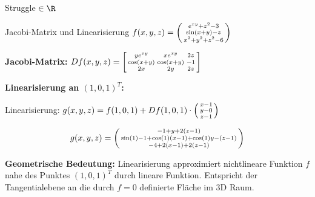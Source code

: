 \begin{remark}
    Struggle $\in \R$
\end{remark}

\begin{example2}{Jacobi-Matrix und Linearisierung} \small
$f(x, y, z) = \begin{psmallmatrix} e^{xy} + z^2 - 3 \\ \sin(x + y) - z \\ x^2 + y^2 + z^2 - 6 \end{psmallmatrix}$

\textbf{Jacobi-Matrix:}
$Df(x, y, z) = \begin{bsmallmatrix} ye^{xy} & xe^{xy} & 2z \\ \cos(x + y) & \cos(x + y) & -1 \\ 2x & 2y & 2z \end{bsmallmatrix}$

\textbf{Linearisierung an $(1, 0, 1)^T$:}


Linearisierung: $g(x, y, z) = f(1, 0, 1) + Df(1, 0, 1) \cdot \begin{psmallmatrix} x - 1 \\ y - 0 \\ z - 1 \end{psmallmatrix}$

$$g(x, y, z) = \begin{psmallmatrix} -1 + y + 2(z-1) \\ \sin(1) - 1 + \cos(1)(x-1) + \cos(1)y - (z-1) \\ -4 + 2(x-1) + 2(z-1) \end{psmallmatrix}$$

\textbf{Geometrische Bedeutung:}
Linearisierung approximiert nichtlineare Funktion $f$ nahe des Punktes $(1, 0, 1)^T$ durch lineare Funktion. Entspricht der Tangentialebene an die durch $f = 0$ definierte Fläche im 3D Raum.
\end{example2}

